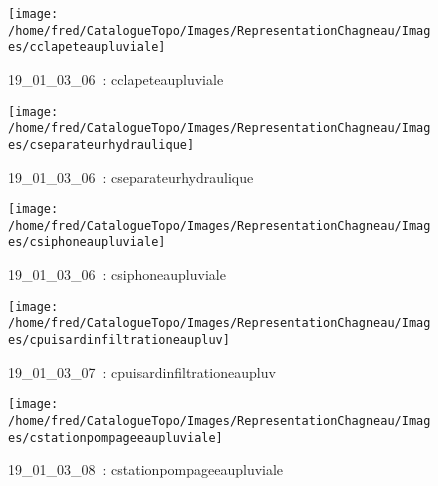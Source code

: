 \documentclass[12pt,titlepage]{book}
\begin{document}
\begin{figure}[h!]
\begin{minipage}[t]{3cm}
  \end{minipage}
  \begin{minipage}[t]{3cm}
    \begin{center}
      \texttt{[image: /home/fred/CatalogueTopo/Images/RepresentationChagneau/Images/cclapeteaupluviale]}
      \caption[~19\_01\_03\_06]{\small{19\_01\_03\_06~:} \tiny{cclapeteaupluviale}}\label{cclapeteaupluviale}
    \end{center}
  \end{minipage}
  \begin{minipage}[t]{3cm}
    \begin{center}
      \texttt{[image: /home/fred/CatalogueTopo/Images/RepresentationChagneau/Images/cseparateurhydraulique]}
      \caption[~19\_01\_03\_06]{\small{19\_01\_03\_06~:} \tiny{cseparateurhydraulique}}\label{cseparateurhydraulique}
    \end{center}
  \end{minipage}
  \begin{minipage}[t]{3cm}
    \begin{center}
      \texttt{[image: /home/fred/CatalogueTopo/Images/RepresentationChagneau/Images/csiphoneaupluviale]}
      \caption[~19\_01\_03\_06]{\small{19\_01\_03\_06~:} \tiny{csiphoneaupluviale}}\label{csiphoneaupluviale}
    \end{center}
  \end{minipage}
  \begin{minipage}[t]{3cm}
    \begin{center}
      \texttt{[image: /home/fred/CatalogueTopo/Images/RepresentationChagneau/Images/cpuisardinfiltrationeaupluv]}
      \caption[~19\_01\_03\_07]{\small{19\_01\_03\_07~:} \tiny{cpuisardinfiltrationeaupluv}}\label{cpuisardinfiltrationeaupluv}
    \end{center}
  \end{minipage}
  \begin{minipage}[t]{3cm}
    \begin{center}
      \texttt{[image: /home/fred/CatalogueTopo/Images/RepresentationChagneau/Images/cstationpompageeaupluviale]}
      \caption[~19\_01\_03\_08]{\small{19\_01\_03\_08~:} \tiny{cstationpompageeaupluviale}}\label{cstationpompageeaupluviale}
    \end{center}

\end{minipage}
\end{figure}
\end{document}
